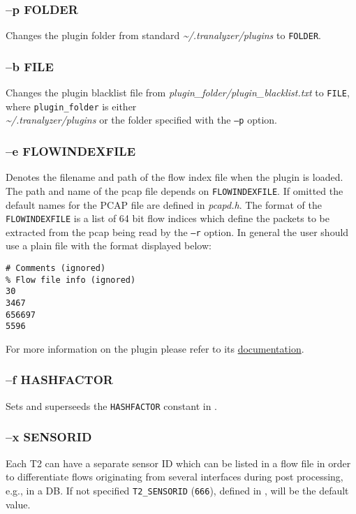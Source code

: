\subsubsection{--p FOLDER}
Changes the plugin folder from standard {\em \textasciitilde{}/.tranalyzer/plugins} to {\tt FOLDER}.

\subsubsection{--b FILE}
Changes the plugin blacklist file from {\em plugin\_folder/plugin\_blacklist.txt} to {\tt FILE}, where {\tt plugin\_folder} is either\\
{\em\textasciitilde{}/.tranalyzer/plugins} or the folder specified with the {\tt --p} option.

\subsubsection{--e FLOWINDEXFILE}
Denotes the filename and path of the flow index file when the  plugin is loaded.
The path and name of the pcap file depends on {\tt FLOWINDEXFILE}.
If omitted the default names for the PCAP file are defined in {\em pcapd.h}. The format of the {\tt FLOWINDEXFILE} is a list of 64 bit flow indices which define the packets to be extracted from the pcap being read by the {\tt --r} option.
In general the user should use a plain file with the format displayed below:

\begin{scriptsize}
\begin{lstlisting}
# Comments (ignored)
% Flow file info (ignored)
30
3467
656697
5596
\end{lstlisting}
\end{scriptsize}

For more information on the  plugin please refer to its \href{../../pcapd/doc/pcapd.pdf}{documentation}.

\subsubsection{--f HASHFACTOR}\label{s:foption}
Sets and superseeds the {\tt HASHFACTOR} constant in .

\subsubsection{--x SENSORID}
Each T2 can have a separate sensor ID which can be listed in a flow file in order to differentiate flows
originating from several interfaces during post processing, e.g., in a DB. If not specified {\tt T2\_SENSORID} ({\tt 666}), defined in , will be the default value.


